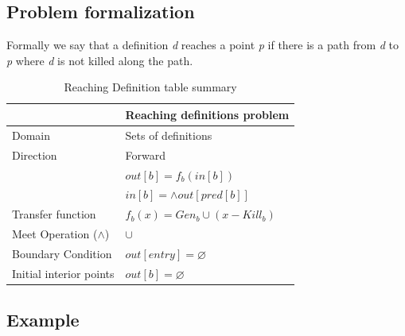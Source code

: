 \documentclass{article}
\begin{document}
\subsection{Problem formalization}

Formally we say that a definition \textit{d} reaches a point \textit{p} if there is a path from \textit{d} to \textit{p} where \textit{d} is not killed along the path.

\begin{table}[H]
\centering
\begin{tabular}{|p{}|p{}|}
\hline
 & \textbf{Reaching definitions problem} \\
\hline
Domain & Sets of definitions \\
\hline
Direction & Forward \\
 & $out[b] = f_b(in[b])$ \\
 & $in[b] = \wedge out[pred[b]]$ \\
\hline
Transfer function & $f_b(x) = Gen_b \cup (x - Kill_b)$ \\
\hline
Meet Operation ($\wedge$) & $\cup$ \\
\hline
Boundary Condition & $out[entry] = \varnothing$  \\
\hline
Initial interior points & $out[b] = \varnothing$  \\
\hline
\end{tabular}
\caption{Reaching Definition table summary}
\label{tab:dataflow_problem_x}
\end{table}

\subsection{Example}
\end{document}
